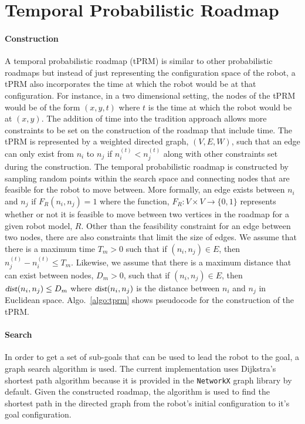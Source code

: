 \documentclass{article}
\newcommand{\Var}[1]{\ensuremath{{\small{\textsl{#1}}}}}
\newcommand{\n}[2]{\ensuremath{n^{(#2)}_{#1}}}
\begin{document}
\maketitle

\section{Temporal Probabilistic Roadmap}

\paragraph{Construction} A temporal probabilistic roadmap (tPRM) is similar to
other probabilistic roadmaps but instead of just representing the configuration
space of the robot, a tPRM also incorporates the time at which the robot would
be at that configuration. For instance, in a two dimensional setting, the nodes
of the tPRM would be of the form $(x, y, t)$ where $t$ is the time at which the
robot would be at $(x, y)$. The addition of time into the tradition approach
allows more constraints to be set on the construction of the roadmap that
include time. The tPRM is represented by a weighted directed graph, $(V, E,
W)$, such that an edge can only exist from $n_i$ to $n_j$ if $\n{i}{t} <
\n{j}{t}$ along with other constraints set during the construction.  The
temporal probabilistic roadmap is constructed by sampling random points within
the search space and connecting nodes that are feasible for the robot to move
between.  More formally, an edge exists between $n_i$ and $n_j$ if $F_R(n_i,
n_j) = 1$ where the function, $F_R: V \times V \to \{0, 1\}$ represents whether
or not it is feasible to move between two vertices in the roadmap for a given
robot model, $R$.  Other than the feasibility constraint for an edge between
two nodes, there are also constraints that limit the size of edges. We assume
that there is a maximum time $T_m > 0$ such that if $(n_i, n_j) \in E$, then
$\n{j}{t} - \n{i}{t} \leq T_m$. Likewise, we assume that there is a maximum
distance that can exist between nodes, $D_m > 0$, such that if $(n_i, n_j) \in
E$, then $\Var{dist}(n_i, n_j) \leq D_m$ where $\Var{dist}(n_i, n_j)$ is the
distance between $n_i$ and $n_j$ in Euclidean space. Algo.~\ref{algo:tprm}
shows pseudocode for the construction of the tPRM.

\paragraph{Search} In order to get a set of sub-goals that can be used to lead
the robot to the goal, a graph search algorithm is used. The current
implementation uses Dijkstra's shortest path algorithm because it is provided
in the \verb|NetworkX| graph library by default. Given the constructed roadmap,
the algorithm is used to find the shortest path in the directed graph from the
robot's initial configuration to it's goal configuration.
\end{document}
